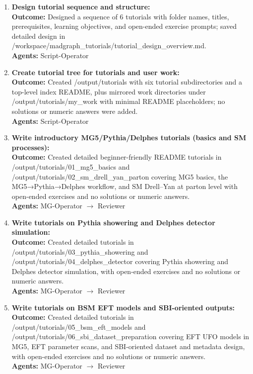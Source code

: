 \documentclass[submission, Phys]{SciPost}
\begin{document}
\begin{planblock}[Plan]
\begin{enumerate}[leftmargin=*, label=\textbf{Step \arabic*:}, itemsep=0.6em]
\item \textbf{Design tutorial sequence and structure:}\\
\textbf{Outcome:} Designed a sequence of 6 tutorials with folder names, titles, prerequisites, learning objectives, and open-ended exercise prompts; saved detailed design in /workspace/madgraph\_tutorials/tutorial\_design\_overview.md.\\
\textbf{Agents:} Script-Operator

\item \textbf{Create tutorial tree for tutorials and user work:}\\ 
\textbf{Outcome:} Created /output/tutorials with six tutorial subdirectories and a top-level index README, plus mirrored work directories under /output/tutorials/my\_work with minimal README placeholders; no solutions or numeric answers were added.\\
\textbf{Agents:} Script-Operator

\item \textbf{Write introductory MG5/Pythia/Delphes tutorials (basics and SM processes):}\\ 
\textbf{Outcome:} Created detailed beginner-friendly README tutorials in /output/tutorials/01\_mg5\_basics and /output/tutorials/02\_sm\_drell\_yan\_parton covering MG5 basics, the MG5→Pythia→Delphes workflow, and SM Drell–Yan at parton level with open-ended exercises and no solutions or numeric answers.\\
\textbf{Agents:} MG-Operator $\rightarrow$ Reviewer

\item \textbf{Write tutorials on Pythia showering and Delphes detector simulation:}\\ 
\textbf{Outcome:} Created detailed tutorials in /output/tutorials/03\_pythia\_showering and /output/tutorials/04\_delphes\_detector covering Pythia showering and Delphes detector simulation, with open-ended exercises and no solutions or numeric answers.\\
\textbf{Agents:} MG-Operator $\rightarrow$ Reviewer

\item \textbf{Write tutorials on BSM EFT models and SBI-oriented outputs:}\\ 
\textbf{Outcome:} Created detailed tutorials in /output/tutorials/05\_bsm\_eft\_models and /output/tutorials/06\_sbi\_dataset\_preparation covering EFT UFO models in MG5, EFT parameter scans, and SBI-oriented dataset and metadata design, with open-ended exercises and no solutions or numeric answers.\\
\textbf{Agents:} MG-Operator $\rightarrow$ Reviewer


\end{enumerate}
\end{planblock}
\end{document}

